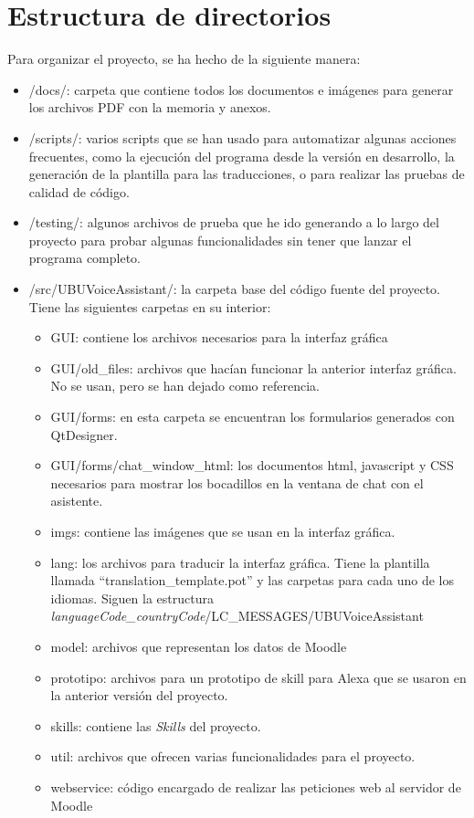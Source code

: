 \section{Estructura de directorios}
Para organizar el proyecto, se ha hecho de la siguiente manera:
\begin{itemize}
    \item /docs/: carpeta que contiene todos los documentos e imágenes para generar los archivos PDF con la memoria y anexos.
    \item /scripts/: varios scripts que se han usado para automatizar algunas acciones frecuentes, como la ejecución del programa desde la versión en desarrollo, la generación de la plantilla para las traducciones, o para realizar las pruebas de calidad de código.
    \item /testing/: algunos archivos de prueba que he ido generando a lo largo del proyecto para probar algunas funcionalidades sin tener que lanzar el programa completo.
    \item /src/UBUVoiceAssistant/: la carpeta base del código fuente del proyecto. Tiene las siguientes carpetas en su interior:
    \begin{itemize}
        \item GUI: contiene los archivos necesarios para la interfaz gráfica
        \item GUI/old\_files: archivos que hacían funcionar la anterior interfaz gráfica. No se usan, pero se han dejado como referencia.
        \item GUI/forms: en esta carpeta se encuentran los formularios generados con QtDesigner.
        \item GUI/forms/chat\_window\_html: los documentos html, javascript y CSS necesarios para mostrar los bocadillos en la ventana de chat con el asistente.
        \item imgs: contiene las imágenes que se usan en la interfaz gráfica.
        \item lang: los archivos para traducir la interfaz gráfica. Tiene la plantilla llamada ``translation\_template.pot'' y las carpetas para cada uno de los idiomas. Siguen la estructura \textit{languageCode\_countryCode}/LC\_MESSAGES/UBUVoiceAssistant
        \item model: archivos que representan los datos de Moodle
        \item prototipo: archivos para un prototipo de skill para Alexa que se usaron en la anterior versión del proyecto.
        \item skills: contiene las \textit{Skills} del proyecto.
        \item util: archivos que ofrecen varias funcionalidades para el proyecto.
        \item webservice: código encargado de realizar las peticiones web al servidor de Moodle
    \end{itemize}
\end{itemize}

